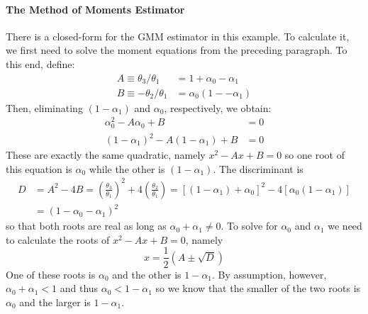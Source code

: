 \documentclass[12pt]{article}
\begin{document}
\paragraph{The Method of Moments Estimator}
There is a closed-form for the GMM estimator in this example. 
To calculate it, we first need to solve the moment equations from the preceding paragraph.
To this end, define:
\begin{align*}
  A \equiv \theta_3/\theta_1 &= 1 + \alpha_0 - \alpha_1 \\
  B \equiv -\theta_2/\theta_1 &= \alpha_0 (1 - - \alpha_1)
\end{align*}
Then, eliminating $(1 - \alpha_1)$ and $\alpha_0$, respectively, we obtain:
\begin{align*}
  \alpha_0^2 - A\alpha_0 + B &= 0\\
  (1 - \alpha_1)^2 - A(1 - \alpha_1) + B &= 0
\end{align*}
These are exactly the same quadratic, namely $x^2 - Ax + B = 0$ so one root of this equation is $\alpha_0$ while the other is $(1 - \alpha_1)$.
The discriminant is
\begin{align*}
  D &= A^2 - 4 B = \left( \frac{\theta_3}{\theta_1} \right)^2 + 4\left(\frac{\theta_2}{\theta_1} \right) = \left[ (1 - \alpha_1) + \alpha_0 \right]^2 - 4\left[ \alpha_0 (1 - \alpha_1) \right]\\
  &= (1 - \alpha_0 - \alpha_1)^2
\end{align*}
so that both roots are real as long as $\alpha_0 + \alpha_1 \neq 0$.
To solve for $\alpha_0$ and $\alpha_1$ we need to calculate the roots of $x^2 - Ax + B =0$, namely
\[
  x = \frac{1}{2}\left( A \pm \sqrt{D} \right)
\]
One of these roots is $\alpha_0$ and the other is $1 - \alpha_1$.
By assumption, however, $\alpha_0 + \alpha_1 < 1$ and thus $\alpha_0 < 1 - \alpha_1$ so we know that the smaller of the two roots is $\alpha_0$ and the larger is $1 - \alpha_1$.
\end{document}
